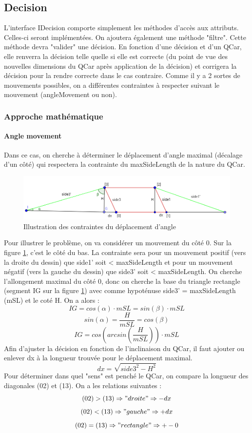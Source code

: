 \documentclass[a4paper, 12pt]{article}
\begin{document}
\subsection{Decision}
L'interface IDecision comporte simplement les méthodes d'accès aux attributs. Celles-ci seront implémentées. On ajoutera également une méthode "filtre". Cette méthode devra "valider" une décision. En fonction d'une décision et d'un QCar, elle renverra la décision telle quelle si elle est correcte (du point de vue des nouvelles dimensions du QCar après application de la décision) et corrigera la décision pour la rendre correcte dans le cas contraire. Comme il y a 2 sortes de mouvements possibles, on a différentes contraintes à respecter suivant le mouvement (angleMovement ou non). 
\subsubsection{Approche mathématique} 
\paragraph{Angle movement} Dans ce cas, on cherche à déterminer le déplacement d'angle maximal (décalage d'un côté) qui respectera la contrainte du maxSideLength de la nature du QCar.
\begin{figure} [h!]
\centering
\includegraphics[width=0.9\linewidth]{includes/images/decisions_angle_movement}
\caption{Illustration des contraintes du déplacement d'angle}
\label{fig:decisionsanglemovement}
\end{figure}
Pour illustrer le problème, on va considérer un mouvement du côté 0. Sur la figure \ref{fig:decisionsanglemovement}, c'est le côté du bas. La contrainte sera pour un mouvement positif (vers la droite du dessin) que side1' soit < maxSideLength et pour un mouvement négatif (vers la gauche du dessin) que side3' soit < maxSideLength. On cherche l'allongement maximal du côté 0, donc on cherche la base du triangle rectangle (segment IG sur la figure \ref{fig:decisionsanglemovement}) avec comme hypoténuse side3' = maxSideLength (mSL) et le coté H. On a alors : \[ IG = cos\left(\alpha\right) \cdot mSL = sin\left(\beta\right) \cdot mSL \]
\[ sin\left(\alpha\right) = \frac{H}{mSL} = cos\left(\beta\right) \]
\[ IG = cos\left(arcsin\left(\frac{H}{mSL}\right)\right) \cdot mSL \]
Afin d'ajuster la décision en fonction de l'inclinaison du QCar, il faut ajouter ou enlever dx à la longueur trouvée pour le déplacement maximal.
\[dx = \sqrt{side3^2-H^2}\]
Pour déterminer dans quel "sens" est penché le QCar, on compare la longueur des diagonales (02) et (13). On a les relations suivantes : 
\[(02)>(13) \Rightarrow "droite" \Rightarrow -dx\] 
 \[(02)<(13) \Rightarrow "gauche" \Rightarrow +dx\] 
 \[(02)=(13) \Rightarrow "rectangle" \Rightarrow +-0\] 
\end{document}
